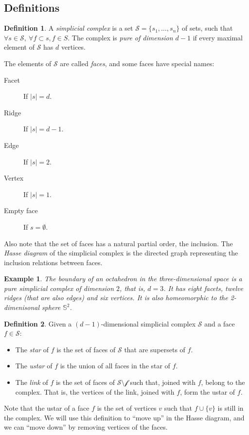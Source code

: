 \documentclass[12pt,a4paper]{article}
\theoremstyle{plain}
\newtheorem*{example}{Example}
\theoremstyle{definition}
\newtheorem{definition}{Definition}
\begin{document}
\subsection{Definitions}
\begin{definition}
  A \emph{simplicial complex}  is a set $\mathcal{S}=\{s_1,\dots,s_n\}$ of sets, such that  $\forall s\in \mathcal{S}, \  \forall f\subset s, f\in{S}$. The complex is \emph{pure of dimension $d-1$} if every maximal element of $\mathcal{S}$ has $d$ vertices.

  The elements of $\mathcal{S}$ are called \emph{faces}, and some faces have special names:
  \begin{description}
    \item[Facet] If $|s|=d$.
    \item[Ridge] If $|s|=d-1$.
    \item[Edge] If $|s|=2$.
    \item[Vertex] If $|s|=1$.
    \item[Empty face] If $s=\emptyset$.
  \end{description}
  Also note that the set of faces has a natural partial order, the inclusion. The \emph{Hasse diagram} of the simplicial complex is the directed graph representing the inclusion relations between faces.
\end{definition}

\begin{example}
  The boundary of an octahedron in the three-dimensional space is a pure simplicial complex of dimension $2$, that is, $d=3$. It has eight facets, twelve ridges (that are also edges) and six vertices. It is also homeomorphic to the 2-dimenisonal sphere $\mathbb{S}^2$.
\end{example}

\begin{definition}
  Given a $(d-1)$-dimensional simplicial complex $\mathcal{S}$ and a face $f\in\mathcal{S}$:
  \begin{itemize}
    \item The \emph{star} of $f$ is the set of faces of $\mathcal{S}$ that are supersets of $f$.
    \item The \emph{ustar} of $f$ is the union of all faces in the star of $f$.
    \item The \emph{link} of $f$ is the set of faces of $\mathcal{S\setminus f}$ such that, joined with $f$, belong to the complex. That is, the vertices of the link, joined with $f$, form the ustar of $f$.
  \end{itemize}
  Note that the ustar of a face $f$ is the set of vertices $v$ such that $f\cup \{v\}$ is still in the complex. We will use this definition to ``move up'' in the Hasse diagram, and we can ``move down'' by removing vertices of the faces.
\end{definition}
\end{document}
